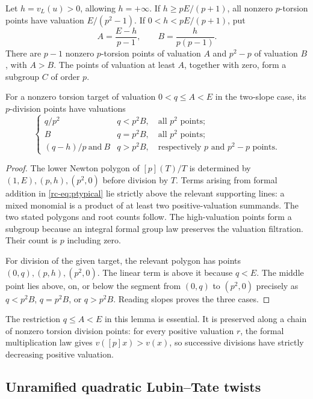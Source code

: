 \begin{lemma}\label{rc-lem:newton}
Let $h=v_L(u)>0$, allowing $h=+\infty$. If
$h\geq pE/(p+1)$, all nonzero $p$-torsion points have valuation
$E/(p^2-1)$. If $0<h<pE/(p+1)$, put
\[
 A=\frac{E-h}{p-1},\qquad B=\frac{h}{p(p-1)}.
\]
There are $p-1$ nonzero $p$-torsion points of valuation $A$ and
$p^2-p$ of valuation $B$, with $A>B$. The points of valuation at least
$A$, together with zero, form a subgroup $C$ of order $p$.

For a nonzero torsion target of valuation $0<q\leq A<E$ in the two-slope
case, its $p$-division points have valuations
\[
 \begin{cases}
 q/p^2 & q<p^2B,\quad\text{all }p^2\text{ points};\\
 B & q=p^2B,\quad\text{all }p^2\text{ points};\\
 (q-h)/p\ \text{and}\ B & q>p^2B,
 \quad\text{respectively }p\text{ and }p^2-p\text{ points}.
 \end{cases}
\]
\end{lemma}

\begin{proof}
The lower Newton polygon of $[p](T)/T$ is determined by
$(1,E),(p,h),(p^2,0)$ before division by $T$.
Terms arising from formal addition in \eqref{rc-eq:ptypical} lie strictly
above the relevant supporting lines: a mixed monomial is a product of at
least two positive-valuation summands. The two stated polygons and root
counts follow.
The high-valuation points form a subgroup because an integral formal group
law preserves the valuation filtration. Their count is $p$ including zero.

For division of the given target, the relevant polygon has points
$(0,q),(p,h),(p^2,0)$. The linear term is above it because $q<E$.
The middle point lies above, on, or below the segment from $(0,q)$ to
$(p^2,0)$ precisely as $q<p^2B$, $q=p^2B$, or $q>p^2B$.
Reading slopes proves the three cases.
\end{proof}

The restriction $q\leq A<E$ in this lemma is essential. It is preserved
along a chain of nonzero torsion division points: for every positive
valuation $r$, the formal multiplication law gives $v([p]x)>v(x)$, so
successive divisions have strictly decreasing positive valuation.

\subsection{Unramified quadratic Lubin--Tate twists}


